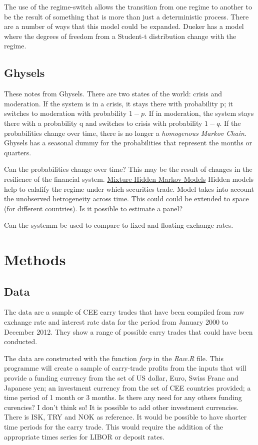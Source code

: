\documentclass[12pt, a4paper, oneside]{article} %
\begin{document}
The use of the regime-switch allows the transition from one regime to another to be the result of something that is more than just a deterministic process. There are a number of ways that this model could be expanded.  Dueker has a model where the degrees of freedom from a Student-t distribution change with the regime.  

\subsection{Ghysels}
These notes from Ghysels.  There are two states of the world:  crisis and moderation.  If the system is in a crisis, it stays there with probability p; it switches to moderation with probability $1-p$.  If in moderation, the system stays there with a probability q and switches to crisis with probability $1-q$.  If the probabilities change over time, there is no longer a \emph{homogenous Markov Chain}. Ghysels has a seasonal dummy for the probabilities that represent the months or quarters.  

Can the probabilities change over time?  This may be the result of changes in the resilience of the financial system. 
\href{http://members.home.nl/jeroenvermunt/dias2010.pdf}{Mixture Hidden Markov Models} Hidden models help to calafify the regime under which securities trade. Model takes into account the unobserved hetrogeneity across time. This could could be extended to space (for different countries).  Is it possible to estimate a panel? 

Can the systemm be used to compare to fixed and floating exchange rates. 

\section{Methods}
\subsection{Data}
The data are a sample of CEE carry trades that have been compiled from raw exchange rate and interest rate data for the period from January 2000 to December 2012.  They show a range of possible carry trades that could have been conducted. 

The data are constructed with the function \emph{forp} in the \emph{Raw.R} file. This programme will create a sample of carry-trade profits from the inputs that will provide a funding currency from the set of US dollar, Euro, Swiss Franc and Japanese yen; an investment currency from the set of CEE countries provided; a time period of 1 month or 3 months.  Is there any need for any others funding curencies?  I don't think so!   It is possible to add other investment currencies.  There is ISK, TRY and NOK as reference.  It would be possible to have shorter time periods for the carry trade.   This would require the addition of the appropriate times series for LIBOR or deposit rates.  
\end{document}
